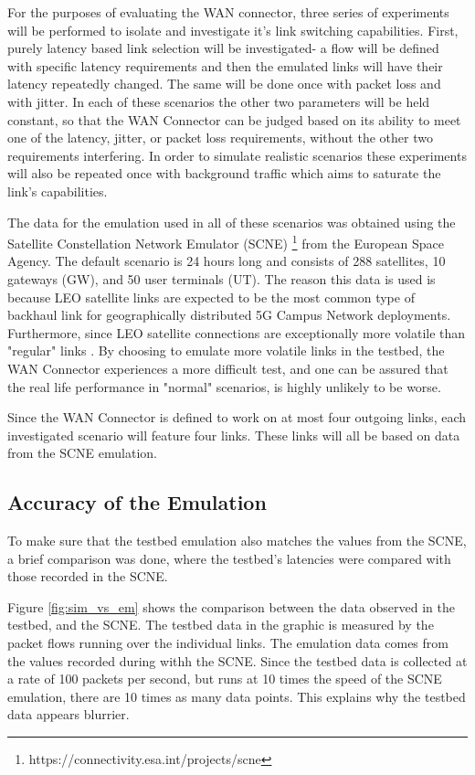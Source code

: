 For the purposes of evaluating the WAN connector, three series of experiments will be performed to isolate and investigate it's link switching capabilities. First, purely latency based link selection will be investigated- a flow will be defined with specific latency requirements and then the emulated links will have their latency repeatedly changed. The same will be done once with packet loss and with jitter. In each of these scenarios the other two parameters will be held constant, so that the WAN Connector can be judged based on its ability to meet one of the latency, jitter, or packet loss requirements, without the other two requirements interfering. In order to simulate realistic scenarios these experiments will also be repeated once with background traffic which aims to saturate the link's capabilities.

The data for the emulation used in all of these scenarios was obtained using the Satellite Constellation Network Emulator (SCNE) \footnote{https://connectivity.esa.int/projects/scne} from the European Space Agency. The default scenario is 24 hours long and consists of 288 satellites, 10 gateways (GW), and 50 user terminals (UT). The reason this data is used is because LEO satellite links are expected to be the most common type of backhaul link for geographically distributed 5G Campus Network deployments. Furthermore, since LEO satellite connections are exceptionally more volatile than "regular" links \cite{deutschmann2022broadband} \cite{ma2023network}. By choosing to emulate more volatile links in the testbed, the WAN Connector experiences a more difficult test, and one can be assured that the real life performance in "normal" scenarios, is highly unlikely to be worse.

Since the WAN Connector is defined to work on at most four outgoing links, each investigated scenario will feature four links. These links will all be based on data from the SCNE emulation.

\subsection{Accuracy of the Emulation}

To make sure that the testbed emulation also matches the values from the SCNE, a brief comparison was done, where the testbed's latencies were compared with those recorded in the SCNE. 

Figure \ref{fig:sim_vs_em} shows the comparison between the data observed in the testbed, and the SCNE. The testbed data in the graphic is measured by the packet flows running over the individual links. The emulation data comes from the values recorded during withh the SCNE. Since the testbed data is collected at a rate of 100 packets per second, but runs at 10 times the speed of the SCNE emulation, there are 10 times as many data points. This explains why the testbed data appears blurrier.

